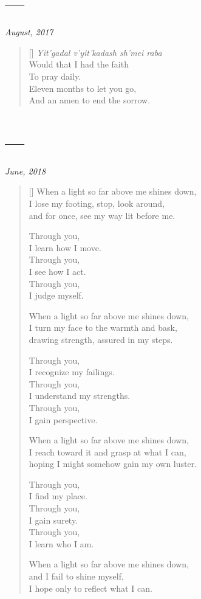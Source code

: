 \section{---}

\hfill\textit{August, 2017}

\begin{verse}[\textwidth]
\textit{Yit'gadal v'yit'kadash sh'mei raba}\\
Would that I had the faith\\
To pray daily.\\
Eleven months to let you go,\\
And an amen to end the sorrow.
\end{verse}
\newpage

\section{---}

\hfill\textit{June, 2018}

\begin{verse}[\textwidth]
When a light so far above me shines down,\\
I lose my footing, stop, look around,\\
and for once, see my way lit before me.

Through you,\\
\vin I learn how I move.\\
Through you,\\
\vin I see how I act.\\
Through you,\\
\vin I judge myself.

When a light so far above me shines down,\\
I turn my face to the warmth and bask,\\
drawing strength, assured in my steps.

Through you,\\
\vin I recognize my failings.\\
Through you,\\
\vin I understand my strengths.\\
Through you,\\
\vin I gain perspective.

When a light so far above me shines down,\\
I reach toward it and grasp at what I can,\\
hoping I might somehow gain my own luster.
\newpage

Through you,\\
\vin I find my place.\\
Through you,\\
\vin I gain surety.\\
Through you,\\
\vin I learn who I am.

When a light so far above me shines down,\\
and I fail to shine myself,\\
I hope only to reflect what I can.
\end{verse}
\newpage

